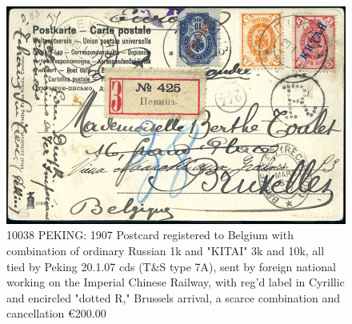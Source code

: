 \begin{figure}[htbp]
\centering
\includegraphics[width=.95\textwidth]{../russian-post-offices-in-china/10038.jpg}
\caption{
10038	PEKING: 1907 Postcard registered to Belgium with combination of 
ordinary Russian 1k and "KITAI" 3k and 10k, all tied by Peking 20.1.07 
cds (T\&S type 7A), sent by foreign national working on the Imperial Chinese 
Railway, with reg'd label in Cyrillic and encircled "dotted R," Brussels 
arrival, a scarce combination and cancellation
\euro 200.00
}  
\end{figure}


